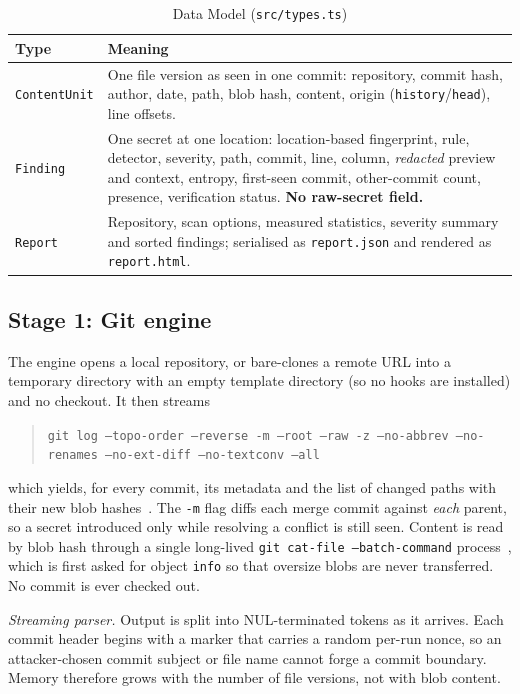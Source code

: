\documentclass[conference]{IEEEtran}
\newcommand{\code}[1]{\texttt{#1}}
\begin{document}
\begin{table}[t]
\centering
\caption{Data Model (\code{src/types.ts})}
\label{tab:model}
\footnotesize
\begin{tabular}{@{}P{17mm}P{63mm}@{}}
\toprule
Type & Meaning \\
\midrule
\code{ContentUnit} & One file version as seen in one commit: repository, commit hash, author,
  date, path, blob hash, content, origin (\code{history}/\code{head}), line offsets. \\
\code{Finding} & One secret at one location: location-based fingerprint, rule, detector,
  severity, path, commit, line, column, \emph{redacted} preview and context, entropy,
  first-seen commit, other-commit count, presence, verification status. \textbf{No raw-secret
  field.} \\
\code{Report} & Repository, scan options, measured statistics, severity summary and sorted
  findings; serialised as \code{report.json} and rendered as \code{report.html}. \\
\bottomrule
\end{tabular}
\end{table}

\subsection{Stage 1: Git engine}
The engine opens a local repository, or bare-clones a remote URL into a temporary directory with
an empty template directory (so no hooks are installed) and no checkout. It then streams
\begin{quote}\footnotesize
\code{git log --topo-order --reverse -m --root --raw -z --no-abbrev --no-renames --no-ext-diff
--no-textconv --all}
\end{quote}
which yields, for every commit, its metadata and the list of changed paths with their new blob
hashes~\cite{gitlog}. The \code{-m} flag diffs each merge commit against \emph{each} parent, so a
secret introduced only while resolving a conflict is still seen. Content is read by blob hash
through a single long-lived \code{git cat-file --batch-command} process~\cite{gitcatfile}, which is
first asked for object \code{info} so that oversize blobs are never transferred. No commit is ever
checked out.

\emph{Streaming parser.} Output is split into NUL-terminated tokens as it arrives. Each commit
header begins with a marker that carries a random per-run nonce, so an attacker-chosen commit
subject or file name cannot forge a commit boundary. Memory therefore grows with the number of file
versions, not with blob content.
\end{document}
